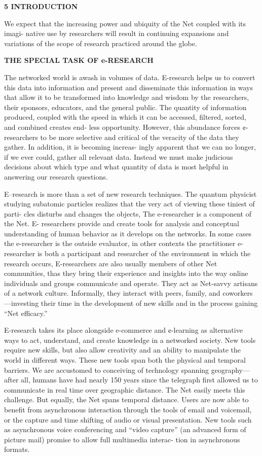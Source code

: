 \documentclass [10pt,a4paper]{book}
\begin{document}
\begin{flushright}
\textbf{5  INTRODUCTION}
\end{flushright}
We expect that the increasing power and ubiquity of the Net coupled with its imagi-
native use by researchers will result in continuing expansions and variations of the
scope of research practiced around the globe.
\begin{flushleft}
\textbf{THE SPECIAL TASK OF e-RESEARCH}
\end{flushleft}
The networked world is awash in volumes of data. E-research helps us to convert this
data into information and present and disseminate this information in ways that allow
it to be transformed into knowledge and wisdom by the researchers, their sponsors,
educators, and the general public. The quantity of information produced, coupled
with the speed in which it can be accessed, filtered, sorted, and combined creates end-
less opportunity. However, this abundance forces ¢-researchers to be more selective
and critical of the veracity of the data they gather. In addition, it is becoming increas-
ingly apparent that we can no longer, if we ever could, gather all relevant data. Instead
we must make judicious decisions about which type and what quantity of data is most
helpful in answering our research questions.


E--research is more than a set of new research techniques. The quantum physicist
studying subatomic particles realizes that the very act of viewing these tiniest of parti-
cles disturbs and changes the objects, The e-researcher is a component of the Net. E-
researchers provide and create tools for analysis and conceptual understanding of
human behavior as it develops on the networks. In some cases the e-researcher is the
outside evaluator, in other contexts the practitioner e-researcher is both a participant
and researcher of the environment in which the research occurs, E-researchers are also
usually members of other Net communities, thas they bring their experience and
insights into the way online individuals and groups communicate and operate. They
act as Net-savvy artisans of a network culture. Informally, they interact with peers,
family, and coworkers—investing their time in the development of new skills and in the
process gaining “Net efficacy.”


E-research takes its place alongside e-commerce and ¢-learning as alternative
ways to act, understand, and create knowledge in a networked society. New tools
require new skills, but also allow creativity and an ability to manipulate the world in
different ways. These new tools span both the physical and temporal barriers. We are
accustomed to conceiving of technology spanning geography—after all, humans have
had nearly 150 years since the telegraph first allowed us to communicate in real time
over geographic distance. The Net easily meets this challenge. But equally, the Net
spans temporal distance. Users are now able to benefit from asynchronous interaction
through the tools of email and voicemail, or the capture and time shifting of audio or
visual presentation. New tools such as asynchronous voice conferencing and “video
capture” (an advanced form of picture mail) promise to allow full multimedia interac-
tion in asynchronous formats.
\end{document}
